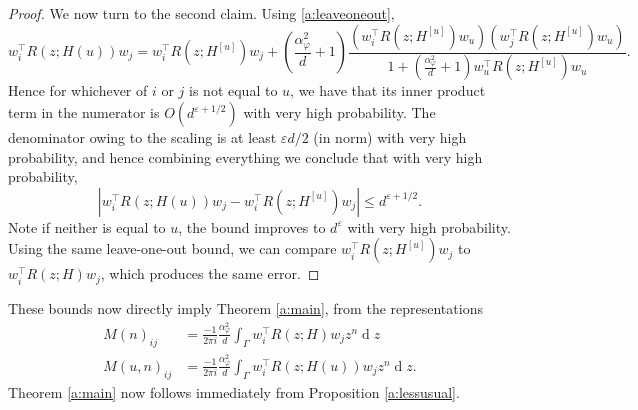 \documentclass[letterpaper, 10pt, dvipsnames]{article}
\numberwithin{equation}{section}
\newcommand{\dif}{\operatorname{d}}
\renewcommand{\epsilon}{\varepsilon}
\renewcommand{\phi}{\varphi}
\theoremstyle{definition}
\begin{document}
\begin{proof}
  We now turn to the second claim.  Using \eqref{a:leaveoneout},
  \[
  w_i^{\top} R(z; H(u)) w_j = w_i^{\top} R(z; H^{[u]}) w_j + \left(\frac{\alpha_\phi^2}{d}+1\right)\frac{\left(w_i^{\top} R(z; H^{[u]}) w_u\right)\left(w_j^{\top} R(z; H^{[u]}) w_u\right)}{1+\left(\frac{\alpha_\phi^2}{d}+1\right)w_u^\top R(z; H^{[u]}) w_u}.
  \]
  Hence for whichever of $i$ or $j$ is not equal to $u$, we have that its inner product term in the numerator is $O(d^{\epsilon+1/2})$ with very high probability.  The denominator owing to the scaling is at least $\epsilon d/2$ (in norm) with very high probability, and hence combining everything we conclude that with very high probability,
  \[
    |w_i^{\top} R(z; H(u)) w_j - w_i^{\top} R(z; H^{[u]}) w_j| \leq d^{\epsilon+1/2}.
  \]
  Note if neither is equal to $u$, the bound improves to $d^{\epsilon}$ with very high probability.  Using the same leave-one-out bound, we can compare $w_i^{\top} R(z; H^{[u]}) w_j$ to $w_i^{\top} R(z; H) w_j$, which produces the same error.
\end{proof}

These bounds now directly imply Theorem \ref{a:main}, from the representations
\[
\begin{aligned}
M(n)_{ij} &= \frac{-1}{2\pi i} \frac{\alpha_\phi^2}{d}\int_{\Gamma} w_i^{\top} R(z;H) w_j z^{n}\dif z \\
M(u,n)_{ij} &= \frac{-1}{2\pi i} \frac{\alpha_\phi^2}{d}\int_{\Gamma} w_i^{\top} R(z;H(u)) w_j z^{n}\dif z.
\end{aligned}
\]
Theorem \ref{a:main} now follows immediately from Proposition \ref{a:lessusual}.



\end{document}
